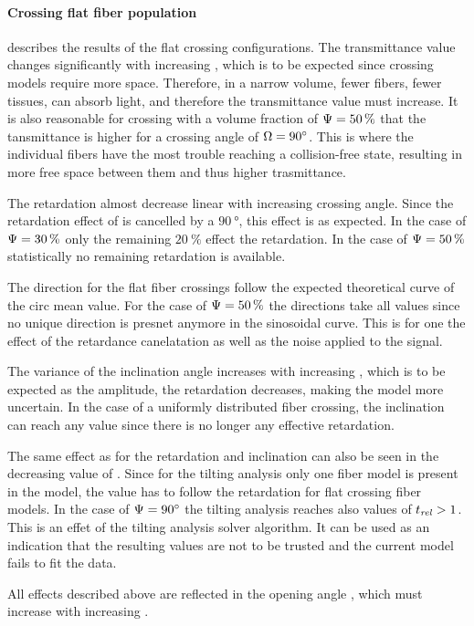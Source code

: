 \paragraph{Crossing flat fiber population}
 describes the results of the flat crossing configurations.
The transmittance value changes significantly with increasing \modelOmega{}, which is to be expected since crossing models require more space.
Therefore, in a narrow volume, fewer fibers, \ie{} fewer tissues, can absorb light, and therefore the transmittance value must increase.
It is also reasonable for crossing with a volume fraction of $\textnormal{$\Psi$}=\SI{50}{\percent}$ that the tansmittance is higher for a crossing angle of $\textnormal{$\Omega$}=\SI{90}{\degree}$.
This is where the individual fibers have the most trouble reaching a collision-free state, resulting in more free space between them and thus higher trasmittance.
\par
%
The retardation almost decrease linear with increasing crossing angle.
Since the retardation effect of is cancelled by a $\SI{90}{\degree}$, this effect is as expected.
In the case of $\textnormal{$\Psi$}=\SI{30}{\percent}$ only the remaining $\SI{20}{\percent}$ effect the retardation.
In the case of $\textnormal{$\Psi$}=\SI{50}{\percent}$ statistically no remaining retardation is available.
\par
%
The direction for the flat fiber crossings follow the expected theoretical curve of the circ mean value.
For the case of $\textnormal{$\Psi$}=\SI{50}{\percent}$ the directions take all values since no unique direction is presnet anymore in the sinosoidal curve.
This is for one the effect of the retardance canelatation as well as the noise applied to the signal.
\par
%
The variance of the inclination angle increases with increasing \modelOmega{}, which is to be expected as the amplitude, \ie{} the retardation decreases, making the model more uncertain.
In the case of a uniformly distributed fiber crossing, the inclination can reach any value since there is no longer any effective retardation.
\par
%
The same effect as for the retardation and inclination can also be seen in the decreasing value of \trel{}.
Since for the tilting analysis only one fiber model is present in the model, the \trel{} value has to follow the retardation for flat crossing fiber models.
In the case of $\textnormal{$\Psi$}=\SI{90}{\degree}$ the tilting analysis reaches also values of $\textnormal{$t_\mathit{rel}$}>1$.
This is an effet of the tilting analysis solver algorithm.
It can be used as an indication that the resulting values are not to be trusted and the current model fails to fit the data.
\par
%
All effects described above are reflected in the opening angle \openingAngle{}, which must increase with increasing \modelOmega{}.
%
%
%
